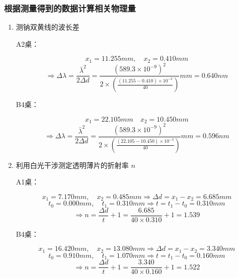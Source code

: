 \documentclass[dvipsnames, svgnames,a4paper,11pt]{article}
\begin{document}
	\subsubsection{根据测量得到的数据计算相关物理量}
	\begin{enumerate}
		\item 测钠双黄线的波长差
		
		A2桌：
		
		\[ 
		x_1=11.255mm, \quad x_2=0.410mm 
		\]
		\[\Rightarrow \Delta\lambda=\frac{\bar{\lambda}^2}{2\Delta d}=\frac{(589.3\times10^{-9})^2}{2\times(\frac{(11.255-0.410)\times10^{-3}}{40})}mm=0.640nm
		\]
		
		B4桌：
		
		\[ 
		x_1=22.105mm \quad x_2=10.450mm 
		\]
		\[\Rightarrow \Delta\lambda=\frac{\bar{\lambda}^2}{2\Delta d}=\frac{(589.3\times10^{-9})^2}{2\times(\frac{(22.105-10.450)\times10^{-3}}{40})}mm=0.596nm
		\]
		
		\item 利用白光干涉测定透明薄片的折射率 $n$
		
		A1桌：
		
		\[ 
		x_1=7.170mm, \quad x_2=0.485mm\Rightarrow \Delta d=x_1-x_2=6.685mm
		\]
		\[ 
		t_0=0.000mm, \quad t_1=0.310mm\Rightarrow t=t_1-t_0=0.310mm
		\]
		\[ 
		\Rightarrow n=\frac{\Delta d}{t}+1=\frac{6.685}{40\times0.310}+1=1.539
		\]
		
		B4桌：
		
		\[ 
		x_1=16.420mm, \quad x_2=13.080mm\Rightarrow \Delta d=x_1-x_2=3.340mm
		\]
		\[ 
		t_0=0.910mm, \quad t_1=1.070mm\Rightarrow t=t_1-t_0=0.160mm
		\]
		\[ 
		\Rightarrow n=\frac{\Delta d}{t}+1=\frac{3.340 }{40\times0.160}+1=1.522
		\]
		
	\end{enumerate}
	
\end{document}
